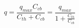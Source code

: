 \begin{equation}
\label{App:Diffusion:equ:uptakeRate}
q = \frac{q_{max}C_{cb}} {C_{th}+C_{cb}} = \frac{q_{max}} {1+\frac{C_{th}}{C_{cb}}}
\end{equation}

%
%
